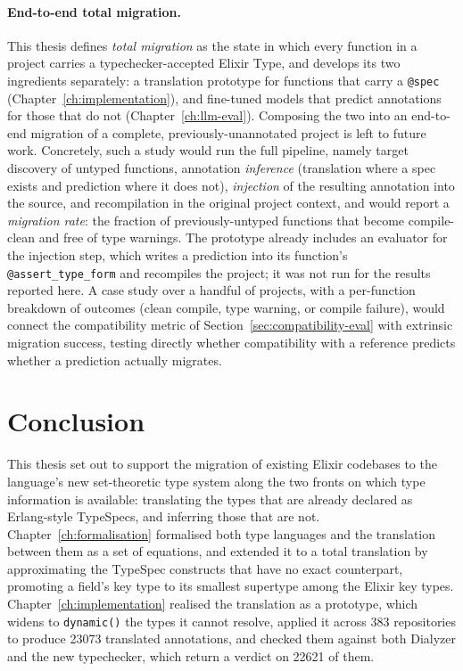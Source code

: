 \paragraph{End-to-end total migration.}
This thesis defines \emph{total migration} as the state in which every function in a project carries a typechecker-accepted Elixir Type, and develops its two ingredients separately: a translation prototype for functions that carry a \texttt{@spec} (Chapter~\ref{ch:implementation}), and fine-tuned models that predict annotations for those that do not (Chapter~\ref{ch:llm-eval}).
Composing the two into an end-to-end migration of a complete, previously-unannotated project is left to future work.
Concretely, such a study would run the full pipeline, namely target discovery of untyped functions, annotation \emph{inference} (translation where a spec exists and prediction where it does not), \emph{injection} of the resulting annotation into the source, and recompilation in the original project context, and would report a \emph{migration rate}: the fraction of previously-untyped functions that become compile-clean and free of type warnings.
The prototype already includes an evaluator for the injection step, which writes a prediction into its function's \texttt{@assert\_type\_form} and recompiles the project; it was not run for the results reported here.
A case study over a handful of projects, with a per-function breakdown of outcomes (clean compile, type warning, or compile failure), would connect the compatibility metric of Section~\ref{sec:compatibility-eval} with extrinsic migration success, testing directly whether compatibility with a reference predicts whether a prediction actually migrates.

\section{Conclusion}

This thesis set out to support the migration of existing Elixir codebases to the language's new set-theoretic type system along the two fronts on which type information is available: translating the types that are already declared as Erlang-style TypeSpecs, and inferring those that are not.
Chapter~\ref{ch:formalisation} formalised both type languages and the translation between them as a set of equations, and extended it to a total translation by approximating the TypeSpec constructs that have no exact counterpart, promoting a field's key type to its smallest supertype among the Elixir key types.
Chapter~\ref{ch:implementation} realised the translation as a prototype, which widens to \texttt{dynamic()} the types it cannot resolve, applied it across 383 repositories to produce \num{23073} translated annotations, and checked them against both Dialyzer and the new typechecker, which return a verdict on \num{22621} of them.

